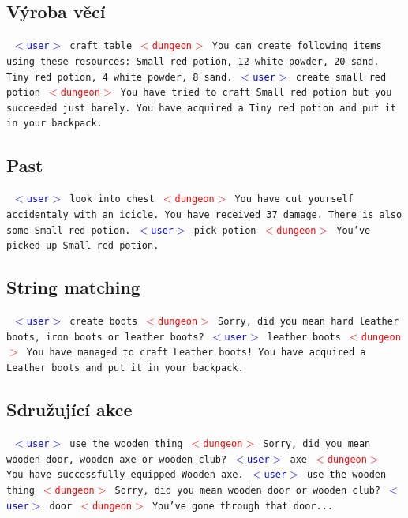 \documentclass[11pt, a4paper]{article}
\newenvironment{example}%
{\smallskip\noindent\ignorespaces\obeylines\tt}%
{\smallskip\par\noindent
\ignorespacesafterend}
\def\user{\textcolor{blue}{$<$user$>$ }}
\def\dung{\textcolor{red}{$<$dungeon$>$ }}
\begin{document}
\subsection{Výroba věcí}
\begin{example}
\user craft table
\dung You can create following items using these resources:
Small red potion, 12 white powder, 20 sand.
Tiny red potion, 4 white powder, 8 sand.
\user create small red potion
\dung You have tried to craft Small red potion but you succeeded just barely. You have acquired a Tiny red potion and put it in your backpack.
\end{example}
\subsection{Past}
\begin{example}
\user look into chest
\dung You have cut yourself accidentaly with an icicle. You have received 37 damage. There is also some Small red potion.
\user pick potion
\dung You've picked up Small red potion.
\end{example}
\subsection{String matching}
\begin{example}
\user create boots
\dung Sorry, did you mean hard leather boots, iron boots or leather boots? 
\user leather boots
\dung You have managed to craft Leather boots! You have acquired a Leather boots and put it in your backpack. 
\end{example}

\subsection{Sdružující akce}
\begin{example}
\user use the wooden thing
\dung Sorry, did you mean wooden door, wooden axe or wooden club?
\user axe
\dung You have successfully equipped Wooden axe.
\user use the wooden thing
\dung Sorry, did you mean wooden door or wooden club?
\user door
\dung You've gone through that door...
\end{example}
\end{document}
